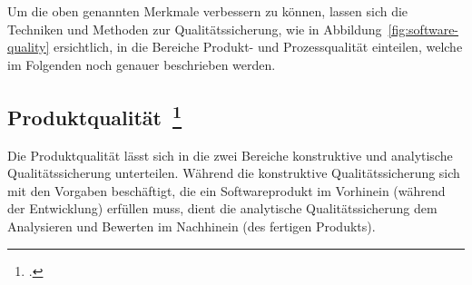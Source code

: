 Um die oben genannten Merkmale verbessern zu können, lassen sich die Techniken und Methoden zur Qualitätssicherung, wie in Abbildung~\ref{fig:software-quality} ersichtlich, in die Bereiche Produkt- und Prozessqualität einteilen, welche im Folgenden noch genauer beschrieben werden.

\subsection[Produktqualität]{Produktqualität~\footcite[vgl.][Kapitel 1.4.1]{hoffmann_software_qualitat_2013}}

Die Produktqualität lässt sich in die zwei Bereiche konstruktive und analytische Qualitätssicherung unterteilen.
Während die konstruktive Qualitätssicherung sich mit den Vorgaben beschäftigt, die ein Softwareprodukt im Vorhinein (während der Entwicklung) erfüllen muss, dient die analytische Qualitätssicherung dem Analysieren und Bewerten im Nachhinein (des fertigen Produkts).

